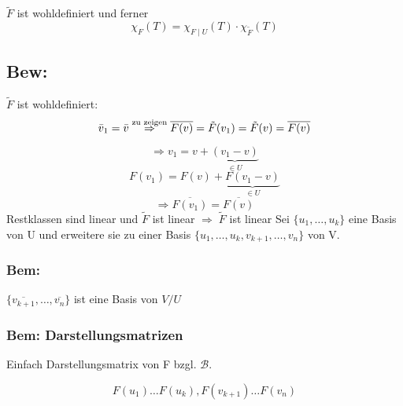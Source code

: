 \documentclass[titlepage,12pt,a4paper,ngerman]{report}
\newcommand{\tx}[1]{\textrm{#1}}
\begin{document}
$\tilde{F}$ ist wohldefiniert und ferner
$$\chi_F(T) = \chi_{F \mid U} (T) \cdot \chi_{\tilde{F}} (T)$$
\subsection{Bew:}
$\tilde{F}$ ist wohldefiniert:
$$\bar{v}_1 = \bar{v} \buildrel \tx{zu zeigen} \over \Rightarrow \overline{F(v)} = \tilde{F}(v_1) = \tilde{F}(v) = \overline{F(v)}$$

$$\Rightarrow v_1 = v + \underbrace{(v_1-v)}_{\in U}$$
$$ F(v_1) = F(v) + \underbrace{F(v_1 - v)}_{\in U}$$
$$\Rightarrow \overline{F(v_1)} = \overline{F(v)}$$
Restklassen sind linear und $\tilde{F}$ ist linear $\Rightarrow\; \tilde{F}$ ist linear
Sei $\{u_1,\dots,u_k\}$ eine Basis von U und erweitere sie zu einer Basis $\{u_1,\dots,u_k, v_{k+1}, \dots, v_n\}$ von V.
\subsubsection{Bem:}
$\{\overline{v_{k+1}},\dots,\overline{v_n}\}$ ist eine Basis von $V/U$ 
\subsubsection{Bem: Darstellungsmatrizen}
Einfach Darstellungsmatrix von F bzgl. $\mathcal{B}$.

\pagebreak
$$F(u_1) \dots F(u_k), F(v_{k+1}) \dots F(v_n)$$ 
\nopagebreak
\end{document}
